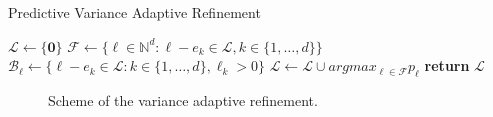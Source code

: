 \documentclass[final,hyperref={pdfpagelabels=false},table]{beamer}
\begin{document}
\begin{frame}
\begin{columns}[T]
\begin{column}{\colCWidth}
\begin{algorithm}[H]
\caption*{Predictive Variance Adaptive Refinement}\label{alg:refine}
\begin{algorithmic}
\State $\mathcal{L} \leftarrow \lbrace \textbf{0} \rbrace$  
\State $\mathcal{F} \leftarrow \lbrace \ell \in \mathbb{N}^d:\ell - e_k \in \mathcal{L}, k\in \lbrace1,\dots,d\rbrace \rbrace$  
\State $\mathcal{B}_\ell \leftarrow \lbrace \ell - e_k \in \mathcal{L}:k\in\lbrace1,\dots,d\rbrace,\ell_k>0\rbrace$   
 
\State $\mathcal{L} \leftarrow \mathcal{L} \cup argmax_{\ell \in \mathcal{F}} p_\ell$ 
\EndFor
\EndWhile
\State \textbf{return} $\mathcal{L}$
\EndProcedure
\end{algorithmic}
\end{algorithm}



\begin{figure}[h]
\centering
	
\caption{Scheme of the variance adaptive refinement.}
\end{figure}


\end{column}
\end{columns}
\end{frame}
\end{document}

